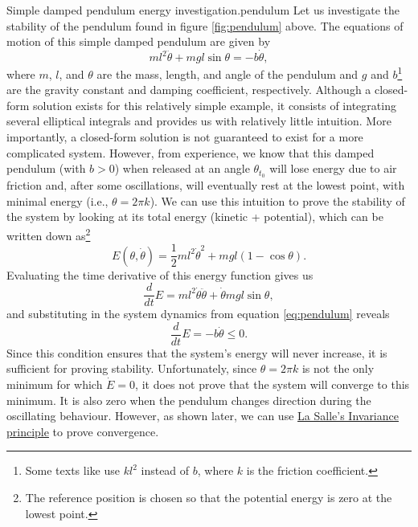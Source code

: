 \begin{example}{Simple damped pendulum energy investigation.}{pendulum}
  Let us investigate the stability of the pendulum found in figure \ref{fig:pendulum} above. The equations of motion of this simple damped pendulum are given by
  \begin{equation} \label{eq:pendulum}
    ml^2\ddot{\theta} + mgl\sin{\theta} = -b\dot{\theta},
  \end{equation}
  where $m$, $l$, and $\theta$ are the mass, length, and angle of the pendulum and $g$ and $b$\footnote{Some texts like \cite{khalilNonlinearControl2015} use $kl^2$ instead of $b$, where $k$ is the friction coefficient.} are the gravity constant and damping coefficient, respectively. Although a closed-form solution exists for this relatively simple example, it consists of integrating several elliptical integrals and provides us with relatively little intuition. More importantly, a closed-form solution is not guaranteed to exist for a more complicated system. However, from experience, we know that this damped pendulum (with $b > 0$) when released at an angle $\theta_{t_0}$ will lose energy due to air friction and, after some oscillations, will eventually rest at the lowest point, with minimal energy (i.e., $\theta = 2\pi k$). We can use this intuition to prove the stability of the system by looking at its total energy (kinetic + potential), which can be written down as\footnote{The reference position is chosen so that the potential energy is zero at the lowest point.}
  \begin{equation} \label{eq:pendulum_energy}
    E\left(\theta, \dot{\theta}\right) = \frac{1}{2}ml^2\dot{\theta}^2 + mgl(1 - \cos{\theta}).
  \end{equation}
  Evaluating the time derivative of this energy function gives us
  \begin{equation}
    \frac{d}{dt}E = ml^2\dot{\theta}\ddot{\theta} + \dot{\theta}mgl\sin{\theta},
  \end{equation}
  and substituting in the system dynamics from equation \eqref{eq:pendulum} reveals
  \begin{equation}
    \frac{d}{dt}E = -b\dot{\theta} \le 0.
  \end{equation}
  Since this condition ensures that the system's energy will never increase, it is sufficient for proving stability. Unfortunately, since $\theta = 2\pi k$ is not the only minimum for which $\dot{E} = 0$, it does not prove that the system will converge to this minimum. It is also zero when the pendulum changes direction during the oscillating behaviour. However, as shown later, we can use \hyperref[th:lasalles]{La Salle's Invariance principle} to prove convergence.
\end{example}

